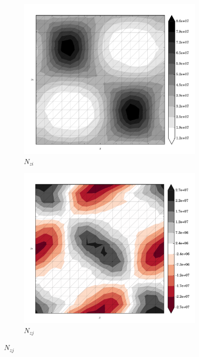 \begin{figure}
  \begin{subfigure}[b]{0.3\linewidth}
    \includegraphics[width=\linewidth]{images/stress_balance/RS/N_zi.pdf}
  \caption{$N_{zi}$}
  \label{rs_N_zi}
  \end{subfigure}
  \begin{subfigure}[b]{0.3\linewidth}
    \includegraphics[width=\linewidth]{images/stress_balance/RS/N_zj.pdf}
  \caption{$N_{zj}$}
  \label{rs_N_zj}
  \end{subfigure}

\end{figure}
